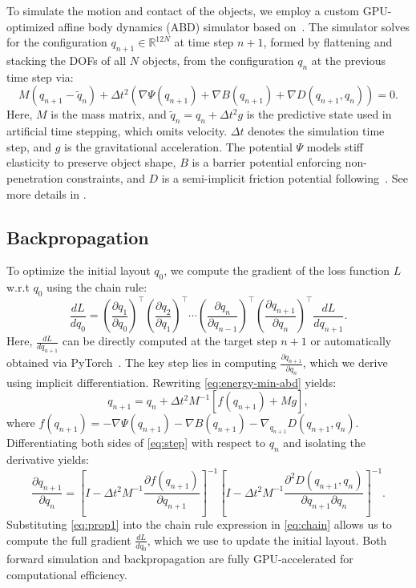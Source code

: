 To simulate the motion and contact of the objects, we employ a custom GPU-optimized affine body dynamics (ABD) simulator based on~\cite{huang2025stiffgipcadvancinggpuipc}. The simulator solves for the configuration $q_{n+1} \in \mathbb{R}^{12N}$ at time step $n+1$, formed by flattening and stacking the DOFs of all $N$ objects, from the configuration $q_n$ at the previous time step via:
\begin{equation}\label{eq:energy-min-abd}
    M(q_{n+1} - \tilde{q}_n) + \Delta t^2 \left( \nabla \Psi(q_{n+1}) + \nabla B(q_{n+1}) + \nabla D(q_{n+1}, q_n) \right) = 0.
\end{equation}
Here, $M$ is the mass matrix, and $\tilde{q}_n = q_n + \Delta t^2 g$ is the predictive state used in artificial time stepping, which omits velocity. $\Delta t$ denotes the simulation time step, and $g$ is the gravitational acceleration. The potential $\Psi$ models stiff elasticity to preserve object shape, $B$ is a barrier potential enforcing non-penetration constraints, and $D$ is a semi-implicit friction potential following~\cite{li2020incremental}. See more details in \cite{li2025physics}.

\subsection{Backpropagation} \label{subsec:phys_optim}
To optimize the initial layout $q_0$, we compute the gradient of the loss function $L$ w.r.t $q_0$ using the chain rule:
\begin{equation}\label{eq:chain}
    \frac{d L}{d q_0} = \left( \frac{\partial q_1}{\partial q_0} \right)^\top 
    \left( \frac{\partial q_2}{\partial q_1} \right)^\top 
    \cdots 
    \left( \frac{\partial q_n}{\partial q_{n-1}} \right)^\top 
    \left( \frac{\partial q_{n+1}}{\partial q_n} \right)^\top 
    \frac{d L}{d q_{n+1}}.
\end{equation}
Here, $\frac{dL}{d q_{n+1}}$ can be directly computed at the target step $n+1$ or automatically obtained via PyTorch~\cite{paszke2019pytorch}. The key step lies in computing $\frac{\partial q_{n+1}}{\partial q_n}$, which we derive using implicit differentiation.
Rewriting \autoref{eq:energy-min-abd} yields:
\begin{equation}\label{eq:step}
    q_{n+1} = q_n + \Delta t^2 M^{-1} \left[ f(q_{n+1}) + Mg \right],
\end{equation}
where $f(q_{n+1}) = -\nabla \Psi(q_{n+1}) - \nabla B(q_{n+1}) - \nabla_{q_{n+1}} D(q_{n+1}, q_n)$.
Differentiating both sides of \autoref{eq:step} with respect to $q_n$ and isolating the derivative yields:
\begin{equation}\label{eq:prop1}
    \frac{\partial q_{n+1}}{\partial q_n} = \left[ I - \Delta t^2 M^{-1} \frac{\partial f(q_{n+1})}{\partial q_{n+1}}\right]^{-1}\left[ I - \Delta t^2 M^{-1} \frac{\partial^2 D(q_{n+1}, q_n)}{\partial q_{n+1}\partial q_{n}}\right]^{-1}.
\end{equation}
Substituting \autoref{eq:prop1} into the chain rule expression in \autoref{eq:chain} allows us to compute the full gradient $\frac{d L}{d q_0}$, which we use to update the initial layout. Both forward simulation and backpropagation are fully GPU-accelerated for computational efficiency.

